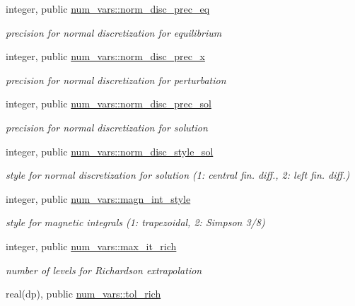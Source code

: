 \begin{DoxyCompactItemize}
integer, public \hyperlink{namespacenum__vars_a9554337420be2ea367f2a6bc71bb654f}{num\+\_\+vars\+::norm\+\_\+disc\+\_\+prec\+\_\+eq}
\begin{DoxyCompactList}\small\item\em precision for normal discretization for equilibrium \end{DoxyCompactList}\item 
integer, public \hyperlink{namespacenum__vars_acba4a05e477f116855028f2057ce4e49}{num\+\_\+vars\+::norm\+\_\+disc\+\_\+prec\+\_\+x}
\begin{DoxyCompactList}\small\item\em precision for normal discretization for perturbation \end{DoxyCompactList}\item 
integer, public \hyperlink{namespacenum__vars_a125bbc64ad3fac6752bc64e4222c6f50}{num\+\_\+vars\+::norm\+\_\+disc\+\_\+prec\+\_\+sol}
\begin{DoxyCompactList}\small\item\em precision for normal discretization for solution \end{DoxyCompactList}\item 
integer, public \hyperlink{namespacenum__vars_a5afcab5bc4c55fdb6a816bf7261160e2}{num\+\_\+vars\+::norm\+\_\+disc\+\_\+style\+\_\+sol}
\begin{DoxyCompactList}\small\item\em style for normal discretization for solution (1\+: central fin. diff., 2\+: left fin. diff.) \end{DoxyCompactList}\item 
integer, public \hyperlink{namespacenum__vars_af0177cf335f43b5d27d9a016770c8f7a}{num\+\_\+vars\+::magn\+\_\+int\+\_\+style}
\begin{DoxyCompactList}\small\item\em style for magnetic integrals (1\+: trapezoidal, 2\+: Simpson 3/8) \end{DoxyCompactList}\item 
integer, public \hyperlink{namespacenum__vars_afbd4cb9a4ef9e8a277aecfc41b09aa1d}{num\+\_\+vars\+::max\+\_\+it\+\_\+rich}
\begin{DoxyCompactList}\small\item\em number of levels for Richardson extrapolation \end{DoxyCompactList}\item 
real(dp), public \hyperlink{namespacenum__vars_aa0091a935b9502afef09a87c0f590e9d}{num\+\_\+vars\+::tol\+\_\+rich}

\end{DoxyCompactItemize}
